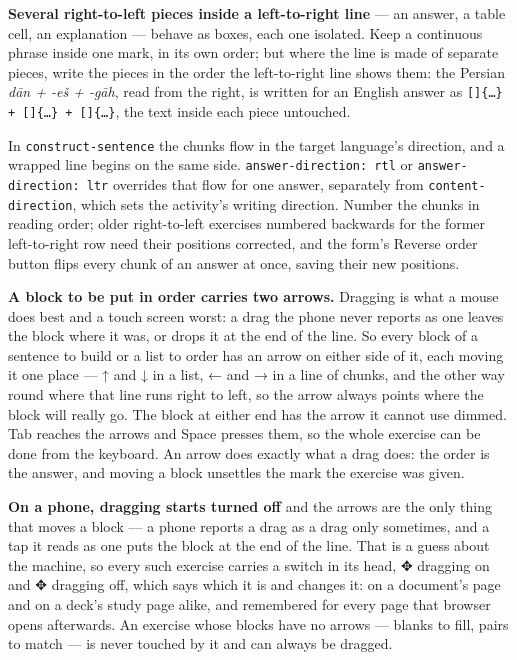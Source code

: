 \documentclass[11pt,oneside]{report}
\newcommand{\pw}[1]{\babelsublr{\mbox{\foreignlanguage{persian}{#1}}}}
\newcommand{\sym}[1]{{\symfont #1}}
\newcommand{\menu}[1]{\textsf{#1}}
\begin{document}
\textbf{Several right-to-left pieces inside a left-to-right line} --- an
answer, a table cell, an explanation --- behave as boxes, each one isolated.
Keep a continuous phrase inside one mark, in its own order; but where the
line is made of separate pieces, write the pieces in the order the
left-to-right line shows them: the Persian \emph{d\=an + -e\v{s} + -g\=ah},
read from the right, is written for an English answer as
\texttt{[}\pw{گاه}\texttt{]\{\ldots\} + [}\pw{ش}\texttt{]\{\ldots\} +
[}\pw{دان}\texttt{]\{\ldots\}}, the text inside each piece untouched.

In \texttt{construct-sentence} the chunks flow in the target language's
direction, and a wrapped line begins on the same side.
\texttt{answer-direction: rtl} or \texttt{answer-direction: ltr} overrides
that flow for one answer, separately from \texttt{content-direction}, which
sets the activity's writing direction. Number the chunks in reading order;
older right-to-left exercises numbered backwards for the former
left-to-right row need their positions corrected, and the form's
\menu{Reverse order} button flips every chunk of an answer at once, saving
their new positions.

\textbf{A block to be put in order carries two arrows.} Dragging is what a
mouse does best and a touch screen worst: a drag the phone never reports as
one leaves the block where it was, or drops it at the end of the line. So
every block of a sentence to build or a list to order has an arrow on either
side of it, each moving it one place --- \menu{↑} and \menu{↓} in a list,
\menu{←} and \menu{→} in a line of chunks, and the other way round where
that line runs right to left, so the arrow always points where the block will
really go. The block at either end has the arrow it cannot use dimmed. Tab
reaches the arrows and Space presses them, so the whole exercise can be done
from the keyboard. An arrow does exactly what a drag does: the order is the
answer, and moving a block unsettles the mark the exercise was given.

\textbf{On a phone, dragging starts turned off} and the arrows are the only
thing that moves a block --- a phone reports a drag as a drag only sometimes,
and a tap it reads as one puts the block at the end of the line. That is a
guess about the machine, so every such exercise carries a switch in its head,
\menu{\sym{✥} dragging on} and \menu{\sym{✥} dragging off}, which says which it is and
changes it: on a document's page and on a deck's study page alike, and
remembered for every page that browser opens afterwards. An exercise whose
blocks have no arrows --- blanks to fill, pairs to match --- is never touched
by it and can always be dragged.
\end{document}
